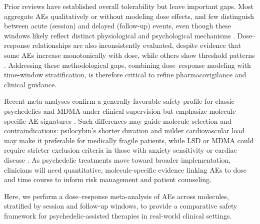 Prior reviews have established overall tolerability but leave important gaps. Most aggregate AEs qualitatively or without modeling dose effects, and few distinguish between acute (session) and delayed (follow-up) events, even though these windows likely reflect distinct physiological and psychological mechanisms \cite{hinkle2024adverse,breeksema2022adverse}. Dose–response relationships are also inconsistently evaluated, despite evidence that some AEs increase monotonically with dose, while others show threshold patterns \cite{holze2022direct,scala2024revival}. Addressing these methodological gaps, combining dose–response modeling with time-window stratification, is therefore critical to refine pharmacovigilance and clinical guidance.

Recent meta-analyses confirm a generally favorable safety profile for classic psychedelics and MDMA under clinical supervision but emphasize molecule-specific AE signatures \cite{hinkle2024adverse,colcott2024mdma}. Such differences may guide molecule selection and contraindications: psilocybin’s shorter duration and milder cardiovascular load may make it preferable for medically fragile patients, while LSD or MDMA could require stricter exclusion criteria in those with anxiety sensitivity or cardiac disease \cite{sarparast2022interactions,omidi2025lsd}. As psychedelic treatments move toward broader implementation, clinicians will need quantitative, molecule-specific evidence linking AEs to dose and time course to inform risk management and patient counseling.

Here, we perform a dose–response meta-analysis of AEs across molecules, stratified by session and follow-up windows, to provide a comparative safety framework for psychedelic-assisted therapies in real-world clinical settings.